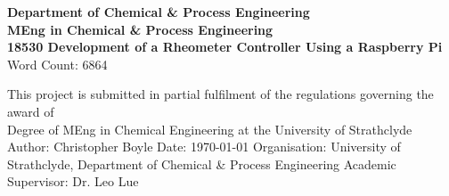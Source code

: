 \documentclass[twoside,a4]{report}
\def\atitle{Development of a Rheometer Controller Using a Raspberry Pi}
\def\thewords{6864} %
\begin{document}
	\begin{titlepage}
		\centering
		\vskip3cm
		{
			\bfseries\Large
			Department of Chemical \& Process Engineering\\
			\vskip1cm
			MEng in Chemical \& Process Engineering\\
			18530
			\vskip3cm
			\LARGE\atitle
		}
		\vskip3cm
		{\small Word Count: \thewords}
		\vskip1cm
		\begin{flushleft}
			This project is submitted in partial fulfilment of the regulations governing the award of \\
			Degree of MEng in Chemical Engineering at the University of Strathclyde
			\vskip2cm
			Author: Christopher Boyle \hfill Date: \today \newline
			\vskip1cm
			Organisation: University of Strathclyde, Department of Chemical \& Process Engineering \newline
			Academic Supervisor: Dr. Leo Lue
		\end{flushleft}
	\end{titlepage}

	\setcounter{page}{0}
	\begin{center}\newpage \end{center}
	
\end{document}
